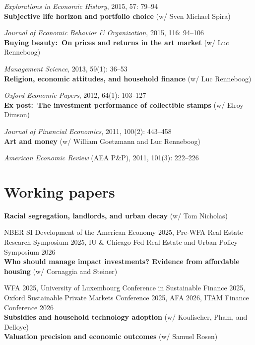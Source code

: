 \documentclass[a4paper]{article}
\begin{document}
\textit{Explorations in Economic History}, 2015, 57: 79--94\\

\textbf{Subjective life horizon and portfolio choice} (w/ Sven Michael Spira)

\textit{Journal of Economic Behavior \& Organization}, 2015, 116: 94--106\\

\textbf{Buying beauty:\ On prices and returns in the art market} (w/ Luc Renneboog)

\textit{Management Science}, 2013, 59(1): 36--53\\

\textbf{Religion, economic attitudes, and household finance }(w/ Luc Renneboog)

\textit{Oxford Economic Papers}, 2012, 64(1): 103--127\\

\textbf{Ex post:\ The investment performance of collectible stamps } (w/ Elroy Dimson)

\textit{Journal of Financial Economics}, 2011, 100(2): 443--458\\

\textbf{Art and money} (w/ William Goetzmann and Luc Renneboog)

\textit{American Economic Review} (AEA P\&P), 2011, 101(3): 222--226


\section*{Working papers}

\textbf{Racial segregation, landlords, and urban decay} (w/ Tom Nicholas) 

NBER SI Development of the American Economy 2025, Pre-WFA Real Estate Research Symposium 2025, IU \& Chicago Fed Real Estate and Urban Policy Symposium 2026 \\

\textbf{Who should manage impact investments? Evidence from affordable housing} (w/ Cornaggia and Steiner) 

WFA 2025, University of Luxembourg Conference in Sustainable Finance 2025, Oxford Sustainable Private Markets Conference 2025, AFA 2026, ITAM Finance Conference 2026 \\

\textbf{Subsidies and household technology adoption} (w/ Koulischer, Pham, and Delloye) \\

\textbf{Valuation precision and economic outcomes}  (w/ Samuel Rosen) 
\end{document}

